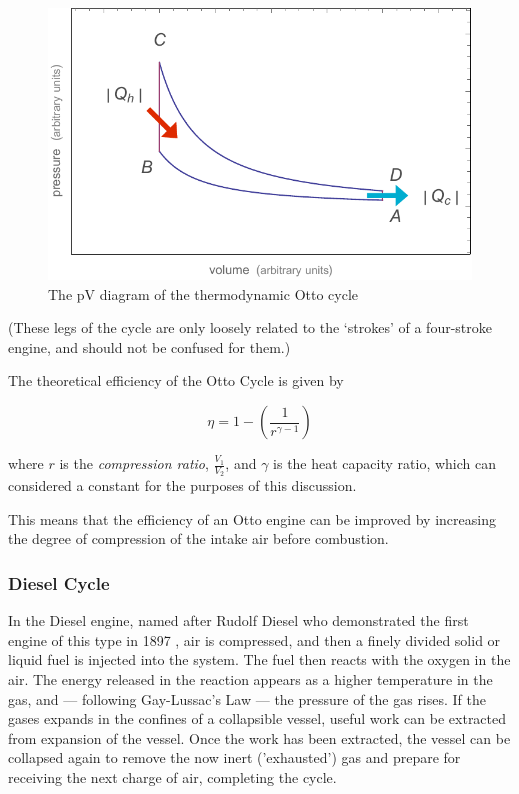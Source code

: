 \begin{figure}
\centering
\includegraphics[width=\textwidth]{Figures/otto-cycle}
\decoRule
\caption[The Otto cycle]{The pV diagram of the thermodynamic Otto cycle}
\label{fig:otto-cycle}
\end{figure}

(These legs of the cycle are only loosely related to the `strokes' of a
four-stroke engine, and should not be confused for them.)

The theoretical efficiency of the Otto Cycle is given by 

\begin{equation}
	\eta = 1 - (\frac{1}{r^{\gamma-1}})
\label{eqn:otto-efficiency}
\end{equation}

where \(r\) is the \textit{compression ratio}, \( \frac{V_1}{V_2} \), and
\(\gamma\) is the heat capacity ratio, which can considered a constant for the
purposes of this discussion.

This means that the efficiency of an Otto engine can be improved by increasing
the degree of compression of the intake air before combustion. 

\subsubsection{Diesel Cycle}

In the Diesel engine, named after Rudolf Diesel who demonstrated the first
engine of this type in 1897 \autocite[Chapter 14]{Cummins1989}, air is
compressed, and then a finely divided solid or liquid fuel is injected into the
system. The fuel then reacts with the oxygen in the air. The energy released in
the reaction appears as a higher temperature in the gas, and --- following
Gay-Lussac's Law --- the pressure of the gas rises. If the gases expands in the
confines of a collapsible vessel, useful work can be extracted from expansion of
the vessel. Once the work has been extracted, the vessel can be collapsed again
to remove the now inert ('exhausted') gas and prepare for receiving the next
charge of air, completing the cycle.

